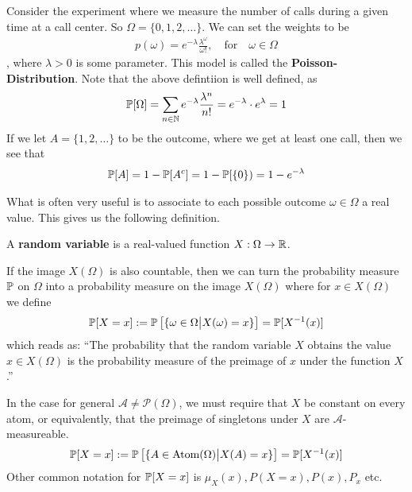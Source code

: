 \begin{ex}
  Consider the experiment where we measure the number of calls during a given time at a call center. So $\Omega = \{0,1,2,\ldots\}$. 
  We can set the weights to be 
  \begin{align*}
    p(\omega) = e^{-\lambda} \frac{\lambda^{\omega}}{\omega!}, \quad \text{for} \quad \omega \in \Omega
  \end{align*}
  , where $\lambda > 0$ is some parameter. This model is called the \textbf{Poisson-Distribution}.
  Note that the above defintiion is well defined, as
  \begin{align*}
    \mathbb{P}[\Omega] = \sum_{n \in \mathbb{N}} e^{-\lambda} \frac{\lambda^{n}}{n!} = e^{- \lambda} \cdot e^{\lambda} = 1
  \end{align*}
  If we let $A = \{1,2, \ldots\}$ to be the outcome, where we get at least one call, then we see that
  \begin{align*}
    \mathbb{P}[A] = 1 - \mathbb{P}[A^{c}] = 1 - \mathbb{P}[\{0\}) = 1 - e^{- \lambda}
  \end{align*}
\end{ex}

What is often very useful is to associate to each possible outcome $\omega \in \Omega$ a real value. This gives us the following definition.

\begin{dfn}
  A \textbf{random variable} is a real-valued function $X: \Omega \to \mathbb{R}$.


  If the image $X(\Omega)$ is also countable, then we can turn the probability measure $\mathbb{P}$ on $\Omega$ into a probability measure on the image $X(\Omega)$ where for $x \in X(\Omega)$ we define
  \begin{align*}
    \mathbb{P}[X = x] := \mathbb{P}\left[\{\omega\in \Omega \big\vert X(\omega) = x\}\right] = \mathbb{P}[X^{-1}(x)]
  \end{align*}
  which reads as: ``The probability that the random variable $X$ obtains the value $x \in X(\Omega)$ is the probability measure of the preimage of $x$ under the function $X$.''

  In the case for general $\mathcal{A} \neq \mathcal{P}(\Omega)$, we must require that $X$ be constant on every atom, or equivalently, that the preimage of singletons under $X$ are $\mathcal{A}$-measureable. 
  \begin{align*}
    \mathbb{P}[X = x] := \mathbb{P} \left[
      \{A \in \text{Atom}(\Omega) \big\vert X(A) = x\}
    \right]
    = \mathbb{P}[X^{-1}(x)]
  \end{align*}
  Other common notation for $\mathbb{P}[X = x]$ is $\mu_X(x), P(X=x), P(x), P_x$ etc.
\end{dfn}
%
%


